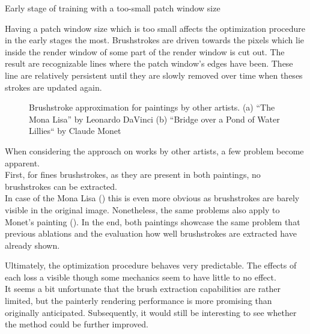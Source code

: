\begin{marginfigure}
    \caption{Early stage of training with a too-small patch window size}
\end{marginfigure}
Having a patch window size which is too small affects the optimization procedure in the early stages the most.
Brushstrokes are driven towards the pixels which lie inside the render window of some part of the render window is cut out.
The result are recognizable lines where the patch window's edges have been.
These line are relatively persistent until they are slowly removed over time when theses strokes are updated again. 

\begin{figure}[!htb]
    \caption{Brushstroke approximation for paintings by other artists. (a) ``The Mona Lisa'' by Leonardo DaVinci (b) ``Bridge over a Pond of Water Lillies`` by Claude Monet}
\end{figure}
When considering the approach on works by other artists, a few problem become apparent.\\
First, for fines brushstrokes, as they are present in both paintings, no brushstrokes can be extracted.\\
In case of the Mona Lisa () this is even more obvious as brushstrokes are barely visible in the original image.
Nonetheless, the same problems also apply to Monet's painting ().
In the end, both paintings showcase the same problem that previous ablations and the evaluation how well brushstrokes are extracted have already shown.

Ultimately, the optimization procedure behaves very predictable.
The effects of each loss a visible though some mechanics seem to have little to no effect.\\
It seems a bit unfortunate that the brush extraction capabilities are rather limited, but the painterly rendering performance is more promising than originally anticipated.
Subsequently, it would still be interesting to see whether the method could be further improved.

